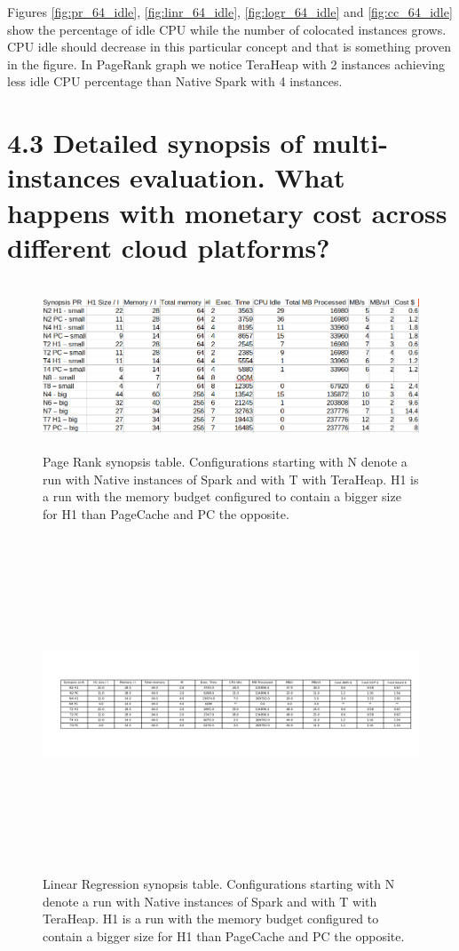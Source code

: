 \documentclass[twocolumn,10pt]{asme2e}
\begin{document}
Figures \ref{fig:pr_64_idle}, \ref{fig:linr_64_idle}, \ref{fig:logr_64_idle} and \ref{fig:cc_64_idle}  show the percentage of idle CPU while the number of colocated instances grows. CPU idle should decrease in this particular concept and that is something proven in the figure. In PageRank graph we notice TeraHeap with 2 instances achieving less idle CPU percentage than Native Spark with 4 instances.

\section*{4.3 Detailed synopsis of multi-instances evaluation. What happens with monetary cost across different cloud platforms?}

\begin{figure}[ht]
        \includegraphics[width=18cm,height=5cm]{pr_table.png}
	\caption{Page Rank synopsis table. Configurations starting with N denote a run with Native instances of Spark and with T with TeraHeap. H1 is a run with the memory budget configured to contain a bigger size for H1 than PageCache and PC the opposite.}
	\label{fig:pr_table}
\end{figure}

\begin{figure}[ht]
        \includegraphics[width=20cm,height=10cm]{linr_table.png}
	\caption{Linear Regression synopsis table. Configurations starting with N denote a run with Native instances of Spark and with T with TeraHeap. H1 is a run with the memory budget configured to contain a bigger size for H1 than PageCache and PC the opposite.}
	\label{fig:linr_table}
\end{figure}
\end{document}
